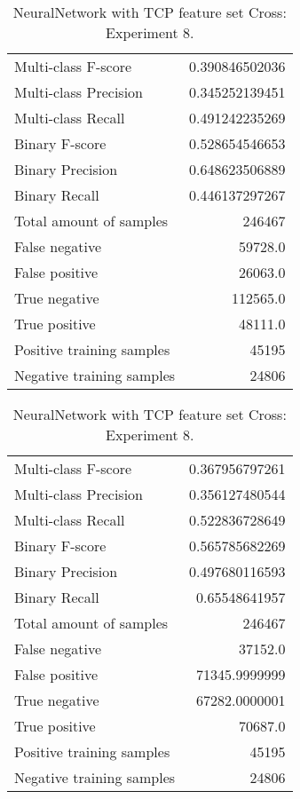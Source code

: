 \begin{table}[H]
\begin{minipage}{0.5\textwidth}
\caption{NeuralNetwork with TCP feature set Cross: \\Experiment 7.}
\centering
\begin{tabular}{l r}
\toprule
Multi-class F-score & 0.390846502036 \\
Multi-class Precision & 0.345252139451 \\
Multi-class Recall & 0.491242235269 \\
\midrule
Binary F-score & 0.528654546653 \\
Binary Precision & 0.648623506889 \\
Binary Recall & 0.446137297267 \\
\midrule
Total amount of samples & 246467 \\
False negative & 59728.0 \\
False positive & 26063.0 \\
True negative & 112565.0 \\
True positive & 48111.0 \\
\midrule
Positive training samples & 45195 \\
Negative training samples & 24806 \\
\bottomrule
\end{tabular}
\end{minipage}
\hfillx
\begin{minipage}{0.5\textwidth}
\caption{NeuralNetwork with TCP feature set Cross: \\Experiment 8.}
\centering
\begin{tabular}{l r}
\toprule
Multi-class F-score & 0.367956797261 \\
Multi-class Precision & 0.356127480544 \\
Multi-class Recall & 0.522836728649 \\
\midrule
Binary F-score & 0.565785682269 \\
Binary Precision & 0.497680116593 \\
Binary Recall & 0.65548641957 \\
\midrule
Total amount of samples & 246467 \\
False negative & 37152.0 \\
False positive & 71345.9999999 \\
True negative & 67282.0000001 \\
True positive & 70687.0 \\
\midrule
Positive training samples & 45195 \\
Negative training samples & 24806 \\
\bottomrule
\end{tabular}
\end{minipage}
\end{table}
